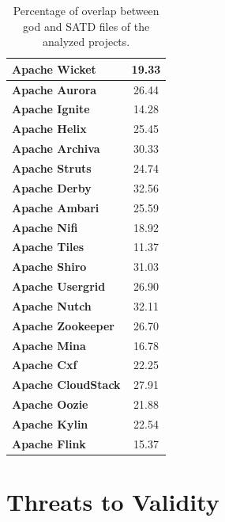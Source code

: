 \begin{table}[htbp]
\begin{tabular}{l|c}
			\textbf{Apache Wicket}     &    19.33     \\ \hline
			\textbf{Apache Aurora}     &    26.44     \\ \hline
			\textbf{Apache Ignite}     &    14.28     \\ \hline
			\textbf{Apache Helix}      &    25.45     \\ \hline
			\textbf{Apache Archiva}    &    30.33     \\ \hline
			\textbf{Apache Struts}     &    24.74     \\ \hline
			\textbf{Apache Derby}      &    32.56     \\ \hline
			\textbf{Apache Ambari}     &    25.59     \\ \hline
			\textbf{Apache Nifi}       &    18.92     \\ \hline
			\textbf{Apache Tiles}      &    11.37     \\ \hline
			\textbf{Apache Shiro}      &    31.03     \\ \hline
			\textbf{Apache Usergrid}   &    26.90     \\ \hline
			\textbf{Apache Nutch}      &    32.11     \\ \hline
			\textbf{Apache Zookeeper}  &    26.70     \\ \hline
			\textbf{Apache Mina}       &    16.78     \\ \hline
			\textbf{Apache Cxf}        &    22.25     \\ \hline
			\textbf{Apache CloudStack} &    27.91     \\ \hline
			\textbf{Apache Oozie}      &    21.88     \\ \hline
			\textbf{Apache Kylin}      &    22.54     \\ \hline
			\textbf{Apache Flink}      &    15.37     \\ \hline
\end{tabular}
	\caption{Percentage of overlap between god and SATD files of the analyzed projects.}
\end{table}



\section{Threats to Validity}
\label{chap4:sec:threats_to_validity}



